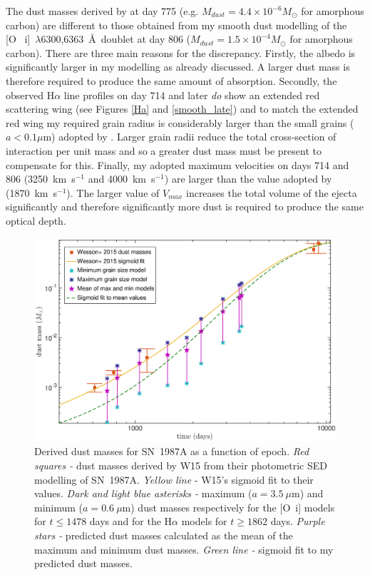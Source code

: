 The dust masses derived by \citet{Lucy1989} at day 775 (e.g. $M_{dust}=4.4 
\times 10^{-6} M_{\odot}$ for amorphous carbon) are  
different to those obtained from my smooth dust modelling of the [O~{\sc 
i}]~$\lambda$6300,6363~\AA\ doublet at day 806 ($M_{dust}=1.5 \times 
10^{-4} M_{\odot}$ for amorphous carbon).  There are three main reasons 
for the discrepancy.  Firstly, the albedo is significantly larger in my 
modelling as already discussed.  A larger dust mass is therefore required 
to produce the same amount of absorption.  Secondly, the observed H$\alpha$ line profiles on day 714 and later {\em do} show an extended red scattering wing (see Figures \ref{Ha} and \ref{smooth_late}) and to match the extended 
red wing my required grain radius is considerably larger than the small 
grains ($a < 0.1\mu$m) adopted by \citet{Lucy1989}. Larger grain radii 
reduce the total cross-section of interaction per unit mass and so a greater dust mass 
must be present to compensate for this. Finally, my adopted maximum 
velocities on days 714 and 806 (3250~km~s$^{-1}$ and 4000~km~s$^{-1}$) are larger than the value adopted 
by \citet{Lucy1989} (1870~km~s$^{-1}$).  The larger value of $V_{max}$ 
increases the total volume of the ejecta significantly and therefore 
significantly more dust is required to produce the same optical depth.

\begin{figure}
\centering
\includegraphics[trim =70 25 85 15,clip=true,scale=0.46]{chapters/chapter5/images/Mdust_evol7.eps}
\caption{Derived dust masses for SN~1987A as a function of epoch. 
\textit{Red squares -} dust masses derived by W15 
from their photometric SED modelling of SN~1987A. \textit{Yellow line} - 
W15's sigmoid fit to 
their values. \textit{Dark and light blue asterisks -} maximum 
($a=3.5~\mu$m) and 
minimum ($a=0.6~\mu$m) dust masses respectively for the [O~{\sc i}] models 
for $t \le 1478$ days and for the H$\alpha$ models for $t \ge 1862$ days. 
\textit{Purple 
stars -} predicted dust masses calculated as the mean of the maximum and 
minimum dust masses.
\textit{Green line -} sigmoid fit 
to my predicted dust masses.}
\label{Mdust}
\end{figure}

